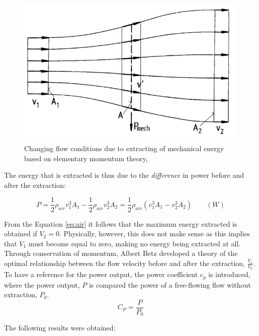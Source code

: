 \begin{figure}[H]
\centering
\includegraphics[scale=0.6]{figures/flow}
\caption[$\; \:$Changing flow conditions due to extracting of mechanical]{Changing flow conditions due to extracting of mechanical energy based on elementary momentum theory, \cite{Hau2013} }
 \label{fig:flow}
\end{figure}

\noindent The energy that is extracted is thus due to the \textit{difference} in power before and after the extraction: 

\begin{equation}
    P = \frac{1}{2}\rho_{air} v^3_1 A_1 - \frac{1}{2}\rho_{air} v^3_2 A_2 =\frac{1}{2}\rho_{air}( v^3_1 A_1 - v^3_2 A_2) \qquad (W)
    \label{eq:air}
\end{equation}

\noindent From the Equation \ref{eq:air} it follows that the maximum energy extracted is obtained if $V_2=0$. Physically, however, this does not make sense as this implies that $V_1$ must become equal to zero, making no energy being extracted at all. Through conservation of momentum, Albert Betz developed a theory of the optimal relationship between the flow velocity before and after the extraction, $\frac{V_1}{V_2}$. To have a reference for the power output, the power coefficient $c_p$ is introduced, where the power output, $P$  is compared the power of a free-flowing flow without extraction, $P_0$. 
  \begin{equation}
    C_P = \frac{P}{P_0}
\end{equation}

\noindent The following results were obtained: 

